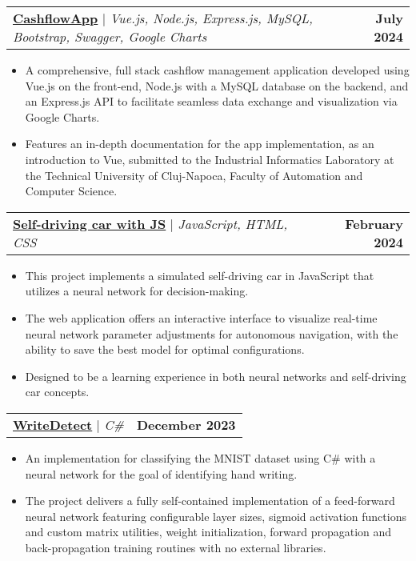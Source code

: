 \documentclass[letterpaper,11pt]{article}
\makeatletter
\newcommand{\resumeItem}[1]{
  \item\small{
    {#1 \vspace{-2pt}}
  }
}
\newcommand{\resumeProjectHeading}[2]{
    \item
    \begin{tabular*}{1.001\textwidth}{l@{\extracolsep{\fill}}r}
      \small#1 & \textbf{\small #2}\\
    \end{tabular*}\vspace{-7pt}
}
\newcommand{\resumeItemListStart}{\begin{itemize}}
\newcommand{\resumeItemListEnd}{\end{itemize}\vspace{-5pt}}
\makeatother
\begin{document}
    \vspace{-15pt}
    \resumeProjectHeading
    {\textbf{\href{https://github.com/BogdanBargaoanu/CashflowApp}{CashflowApp}} $|$ \emph{Vue.js, Node.js, Express.js, MySQL, Bootstrap, Swagger, Google Charts}}{July 2024}
    \resumeItemListStart
        \resumeItem{A comprehensive, full stack cashflow management application developed using Vue.js on the front-end, Node.js with a MySQL database on the backend, and an Express.js API to facilitate seamless data exchange and visualization via Google Charts.}
        \resumeItem{Features an in-depth documentation for the app implementation, as an introduction to Vue, submitted to the Industrial Informatics Laboratory at the Technical University of Cluj-Napoca, Faculty of Automation and Computer Science.}
    \resumeItemListEnd


\begin{comment}



    \vspace{-5pt}
\resumeProjectHeading
{\textbf{Tic Tac Toe with Minimax Algorithm} $|$ \emph{Python and Tkinter}}{March 2024}
\resumeItemListStart
\resumeItem{Implemented a Tic Tac Toe game with an AI opponent powered by the Minimax algorithm, showcasing expertise in artificial intelligence and algorithmic decision-making.}
\resumeItem{Designed and developed a graphical user interface using the Tkinter library, providing intuitive interaction and visual feedback for enhanced user experience.}
\resumeItemListEnd
 \end{comment}  
    \vspace{-15pt}
        \resumeProjectHeading
          {\textbf{\href{https://github.com/BogdanBargaoanu/JavaScriptSelfDrivingCar}{Self-driving car with JS}} $|$ \emph{JavaScript, HTML, CSS}}{February 2024}
          \resumeItemListStart
            \resumeItem{This project implements a simulated self-driving car in JavaScript that utilizes a neural network for decision-making.}
            \resumeItem{The web application offers an interactive interface to visualize real-time neural network parameter adjustments for autonomous navigation, with the ability to save the best model for optimal configurations.}
            \resumeItem{Designed to be a learning experience in both neural networks and self-driving car concepts.}
    \resumeItemListEnd 
 
\vspace{-15pt}
      \resumeProjectHeading
          {\textbf{\href{https://github.com/BogdanBargaoanu/WriteDetect}{WriteDetect}} $|$ \emph{\mbox{C{\#}}}}{December 2023}
          \resumeItemListStart
            \resumeItem{An implementation for classifying the MNIST dataset using \mbox{C{\#}} with a neural network for the goal of identifying hand writing.}
            \resumeItem{The project delivers a fully self-contained implementation of a feed-forward neural network featuring configurable layer sizes, sigmoid activation functions and custom matrix utilities, weight initialization, forward propagation and back-propagation training routines with no external libraries.}
          \resumeItemListEnd 
 \vspace{-5pt}
\end{document}
